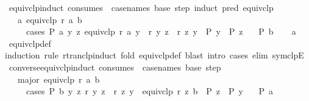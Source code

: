 \begin{isabellebody}
\endisatagproof
{\isafoldproof}%
%
\isadelimproof
\isanewline
%
\endisadelimproof
\isanewline
{}\isamarkupfalse%
\ equivclp{\isacharunderscore}{\kern0pt}induct\ {\isacharbrackleft}{\kern0pt}consumes\ {}{\isacharcomma}{\kern0pt}\ case{\isacharunderscore}{\kern0pt}names\ base\ step{\isacharcomma}{\kern0pt}\ induct\ pred{\isacharcolon}{\kern0pt}\ equivclp{\isacharbrackright}{\kern0pt}{\isacharcolon}{\kern0pt}\isanewline
\ \ \ a{\isacharcolon}{\kern0pt}\ {\isachardoublequoteopen}equivclp\ r\ a\ b{\isachardoublequoteclose}\isanewline
\ \ \ \ \ cases{\isacharcolon}{\kern0pt}\ {\isachardoublequoteopen}P\ a{\isachardoublequoteclose}\ {\isachardoublequoteopen}{\isasymAnd}y\ z{\isachardot}{\kern0pt}\ equivclp\ r\ a\ y\ {\isasymLongrightarrow}\ r\ y\ z\ {\isasymor}\ r\ z\ y\ {\isasymLongrightarrow}\ P\ y\ {\isasymLongrightarrow}\ P\ z{\isachardoublequoteclose}\isanewline
\ \ \ {\isachardoublequoteopen}P\ b{\isachardoublequoteclose}\isanewline
%
\isadelimproof
\ \ %
\endisadelimproof
%
\isatagproof
{}\isamarkupfalse%
\ a\ \isamarkupfalse%
\ equivclp{\isacharunderscore}{\kern0pt}def\isanewline
\ \ \isamarkupfalse%
{\isacharparenleft}{\kern0pt}induction\ rule{\isacharcolon}{\kern0pt}\ rtranclp{\isacharunderscore}{\kern0pt}induct{\isacharsemicolon}{\kern0pt}\ fold\ equivclp{\isacharunderscore}{\kern0pt}def{\isacharsemicolon}{\kern0pt}\ blast\ intro{\isacharcolon}{\kern0pt}\ cases\ elim{\isacharcolon}{\kern0pt}\ symclpE{\isacharparenright}{\kern0pt}%
\endisatagproof
{\isafoldproof}%
%
\isadelimproof
\isanewline
%
\endisadelimproof
\isanewline
{}\isamarkupfalse%
\ converse{\isacharunderscore}{\kern0pt}equivclp{\isacharunderscore}{\kern0pt}induct\ {\isacharbrackleft}{\kern0pt}consumes\ {}{\isacharcomma}{\kern0pt}\ case{\isacharunderscore}{\kern0pt}names\ base\ step{\isacharbrackright}{\kern0pt}{\isacharcolon}{\kern0pt}\isanewline
\ \ \ major{\isacharcolon}{\kern0pt}\ {\isachardoublequoteopen}equivclp\ r\ a\ b{\isachardoublequoteclose}\isanewline
\ \ \ \ \ cases{\isacharcolon}{\kern0pt}\ {\isachardoublequoteopen}P\ b{\isachardoublequoteclose}\ {\isachardoublequoteopen}{\isasymAnd}y\ z{\isachardot}{\kern0pt}\ r\ y\ z\ {\isasymor}\ r\ z\ y\ {\isasymLongrightarrow}\ equivclp\ r\ z\ b\ {\isasymLongrightarrow}\ P\ z\ {\isasymLongrightarrow}\ P\ y{\isachardoublequoteclose}\isanewline
\ \ \ {\isachardoublequoteopen}P\ a{\isachardoublequoteclose}\isanewline
%
\isadelimproof

\end{isabellebody}
